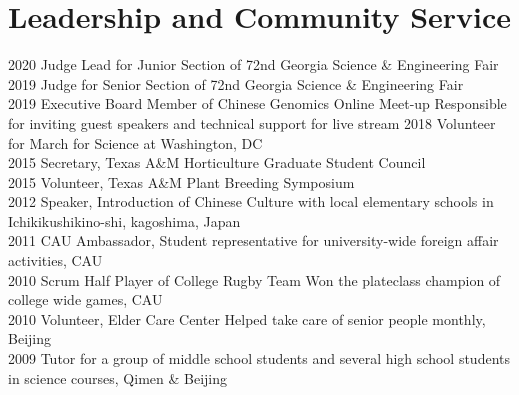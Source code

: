 \documentclass[11pt,a4paper,]{awesome-cv}
\begin{document}
\begin{cventries}
\end{cventries}

\hypertarget{leadership-and-community-service}{%
\section{Leadership and Community
Service}\label{leadership-and-community-service}}

2020 Judge Lead for Junior Section of 72nd Georgia Science \&
Engineering Fair\\
2019 Judge for Senior Section of 72nd Georgia Science \& Engineering
Fair\\
2019 Executive Board Member of Chinese Genomics Online Meet-up
\textbar{} Responsible for inviting guest speakers and technical support
for live stream 2018 Volunteer for March for Science at Washington, DC\\
2015 Secretary, Texas A\&M Horticulture Graduate Student Council\\
2015 Volunteer, Texas A\&M Plant Breeding Symposium\\
2012 Speaker, Introduction of Chinese Culture with local elementary
schools in Ichikikushikino-shi, kagoshima, Japan\\
2011 CAU Ambassador, Student representative for university-wide foreign
affair activities, CAU\\
2010 Scrum Half Player of College Rugby Team \textbar{} Won the
plateclass champion of college wide games, CAU\\
2010 Volunteer, Elder Care Center \textbar{} Helped take care of senior
people monthly, Beijing\\
2009 Tutor for a group of middle school students and several high school
students in science courses, Qimen \& Beijing
\end{document}
